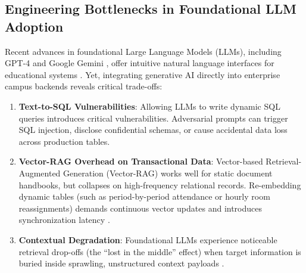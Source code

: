 \documentclass[conference]{IEEEtran}
\begin{document}
\subsection{Engineering Bottlenecks in Foundational LLM Adoption}
Recent advances in foundational Large Language Models (LLMs), including GPT-4 \cite{openai2023gpt4} and Google Gemini \cite{geminitechreport2023}, offer intuitive natural language interfaces for educational systems \cite{kasneci2023chatgpt}. Yet, integrating generative AI directly into enterprise campus backends reveals critical trade-offs:
\begin{enumerate}
    \item \textbf{Text-to-SQL Vulnerabilities}: Allowing LLMs to write dynamic SQL queries introduces critical vulnerabilities. Adversarial prompts can trigger SQL injection, disclose confidential schemas, or cause accidental data loss across production tables.
    \item \textbf{Vector-RAG Overhead on Transactional Data}: Vector-based Retrieval-Augmented Generation (Vector-RAG) \cite{lewis2020retrieval} works well for static document handbooks, but collapses on high-frequency relational records. Re-embedding dynamic tables (such as period-by-period attendance or hourly room reassignments) demands continuous vector updates and introduces synchronization latency \cite{zhang2024intelligent, alshboul2025dynamic}.
    \item \textbf{Contextual Degradation}: Foundational LLMs experience noticeable retrieval drop-offs (the ``lost in the middle'' effect) when target information is buried inside sprawling, unstructured context payloads \cite{liu2024lost}.
\end{enumerate}
\end{document}
